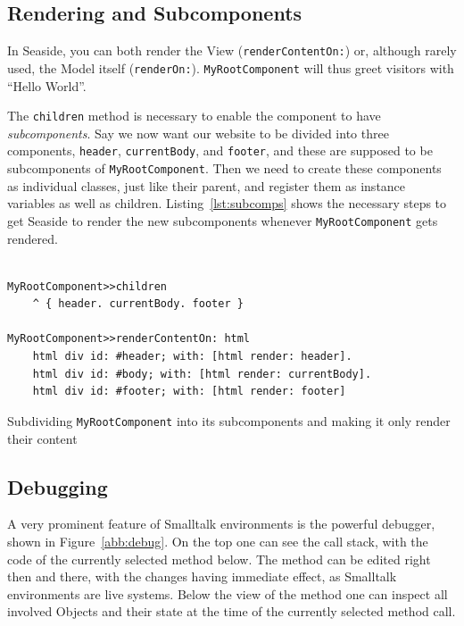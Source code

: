 \documentclass[a4paper,12pt,pagesize,headsepline,titlepage]{scrartcl}
\begin{document}
\subsection{Rendering and Subcomponents}

In Seaside, you can both render the View (\texttt{renderContentOn:}) or, although rarely used, the Model itself (\texttt{renderOn:}). \texttt{MyRootComponent} will thus greet visitors with “Hello World”.

The \texttt{children} method is necessary to enable the component to have \emph{subcomponents}. Say we now want our website to be divided into three components, \texttt{header}, \texttt{currentBody}, and \texttt{footer}, and these are supposed to be subcomponents of \texttt{MyRootComponent}. Then we need to create these components as individual classes, just like their parent, and register them as  instance variables as well as children. Listing~\ref{lst:subcomps} shows the necessary steps to get Seaside to render the new subcomponents whenever \texttt{MyRootComponent} gets rendered.

\begin{listing}[]%
\begin{verbatim}

MyRootComponent>>children
    ^ { header. currentBody. footer }

MyRootComponent>>renderContentOn: html
    html div id: #header; with: [html render: header].
    html div id: #body; with: [html render: currentBody].
    html div id: #footer; with: [html render: footer]

\end{verbatim}
\caption{Subdividing \texttt{MyRootComponent} into its subcomponents and making it only render their content}
\label{lst:subcomps}
\end{listing}

\subsection{Debugging}

A very prominent feature of Smalltalk environments is the powerful debugger, shown in Figure~\ref{abb:debug}. On the top one can see the call stack, with the code of the currently selected method below. The method can be edited right then and there, with the changes having immediate effect, as Smalltalk environments are live systems. Below the view of the method one can inspect all involved Objects and their state at the time of the currently selected method call. 
\end{document}
